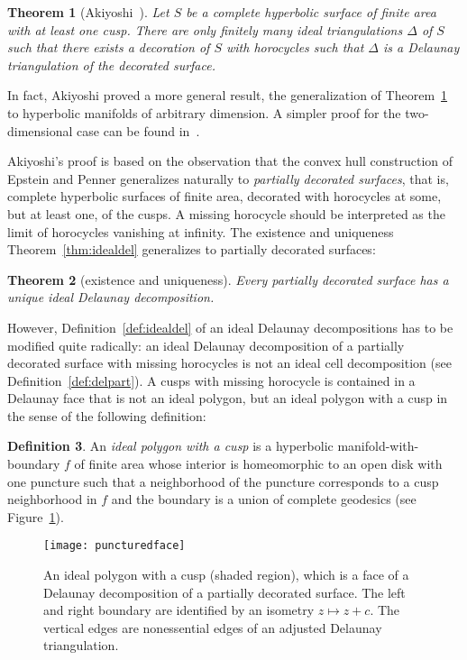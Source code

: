 \documentclass[a4paper, 11pt]{article}
\theoremstyle{plain}
\newtheorem{theorem}{Theorem}[section]
\theoremstyle{definition}
\newtheorem{definition}[theorem]{Definition}
\begin{document}
\begin{theorem}[Akiyoshi~\cite{akiyoshi01}]
  \label{thm:akiyoshi}
  Let $S$ be a complete hyperbolic surface of finite area with at
  least one cusp. There are only finitely many ideal triangulations
  $\Delta$ of $S$ such that there exists a decoration of $S$ with
  horocycles such that $\Delta$ is a Delaunay triangulation of the
  decorated surface. 
\end{theorem}

In fact, Akiyoshi proved a more general result, the
generalization of Theorem~\ref{thm:akiyoshi} to hyperbolic manifolds
of arbitrary dimension. A simpler proof for the two-dimensional case
can be found in~\cite{luo13}.

Akiyoshi's proof is based on the observation that the convex hull
construction of Epstein and Penner generalizes naturally to
\emph{partially decorated surfaces}, that is, complete hyperbolic
surfaces of finite area, decorated with horocycles at some, but at
least one, of the cusps. A missing horocycle should be interpreted as
the limit of horocycles vanishing at infinity. The existence and
uniqueness Theorem~\ref{thm:idealdel} generalizes to partially
decorated surfaces:

\begin{theorem}[existence and uniqueness]
  \label{thm:idealdel2}
  Every partially decorated surface has a unique ideal Delaunay
  decomposition.
\end{theorem}

However, Definition~\ref{def:idealdel} of an ideal Delaunay
decompositions has to be modified quite radically: an ideal Delaunay
decomposition of a partially decorated surface with missing horocycles
is not an ideal cell decomposition (see
Definition~\ref{def:delpart}). A cusps with missing horocycle is
contained in a Delaunay face that is not an ideal polygon, but an ideal
polygon with a cusp in the sense of the following definition:

\begin{definition}
  \label{def:punctured}
  An \emph{ideal polygon with a cusp} is a hyperbolic
  manifold-with-boundary $f$ of finite area whose interior is
  homeomorphic to an open disk with one puncture such that a
  neighborhood of the puncture corresponds to a cusp neighborhood in
  $f$ and the boundary is a union of complete geodesics
  (see Figure~\ref{fig:puncturedface}).
\end{definition}
\begin{figure}
  \centering
  \texttt{[image: puncturedface]}
  \caption{An ideal polygon with a cusp (shaded region), which is a
    face of a Delaunay decomposition of a partially decorated
    surface. The left and right boundary are identified by an isometry
    $z\mapsto z+c$.  The vertical edges are nonessential edges of an
    adjusted Delaunay triangulation.}
  \label{fig:puncturedface}
\end{figure}
\end{document}
